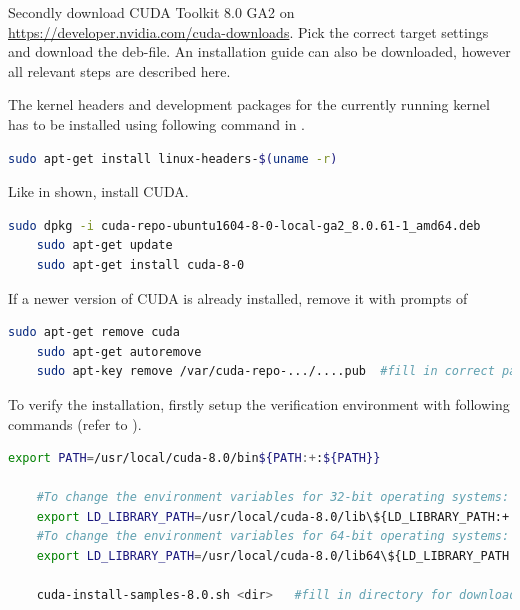 Secondly download CUDA Toolkit 8.0 GA2 on \url{https://developer.nvidia.com/cuda-downloads}. Pick the correct target settings and download the deb-file. An installation guide can also be downloaded, however all relevant steps are described here.

The kernel headers and development packages for the currently running kernel has to be installed using following command in .

\begin{minipage}{\linewidth}
\begin{lstlisting}[caption=Installation of linux-headers, label=list:linuxheaders, language=bash]
	sudo apt-get install linux-headers-$(uname -r)
\end{lstlisting}
\end{minipage}

Like in  shown, install CUDA.

\begin{minipage}{\linewidth}
\begin{lstlisting}[caption=Installation of CUDA, label=list:cuda, language=bash]
	sudo dpkg -i cuda-repo-ubuntu1604-8-0-local-ga2_8.0.61-1_amd64.deb
	sudo apt-get update
	sudo apt-get install cuda-8-0
\end{lstlisting}
\end{minipage}

If a newer version of CUDA is already installed, remove it with prompts of 

\begin{minipage}{\linewidth}
\begin{lstlisting}[caption=Remove CUDA, label=list:cudaUninstall, language=bash]
	sudo apt-get remove cuda
	sudo apt-get autoremove
	sudo apt-key remove /var/cuda-repo-.../....pub	#fill in correct path/file
\end{lstlisting}
\end{minipage}

To verify the installation, firstly setup the verification environment with following commands (refer to ). 

\begin{minipage}{\linewidth}
\begin{lstlisting}[caption=Setup CUDA verification environment, label=list:cudaVerifyEnv, language=bash]
	export PATH=/usr/local/cuda-8.0/bin${PATH:+:${PATH}}
	
	#To change the environment variables for 32-bit operating systems:
	export LD_LIBRARY_PATH=/usr/local/cuda-8.0/lib\${LD_LIBRARY_PATH:+:${LD_LIBRARY_PATH}}
	#To change the environment variables for 64-bit operating systems:
	export LD_LIBRARY_PATH=/usr/local/cuda-8.0/lib64\${LD_LIBRARY_PATH:+:${LD_LIBRARY_PATH}}
	
	cuda-install-samples-8.0.sh <dir>	#fill in directory for downloaded samples
\end{lstlisting}
\end{minipage}

